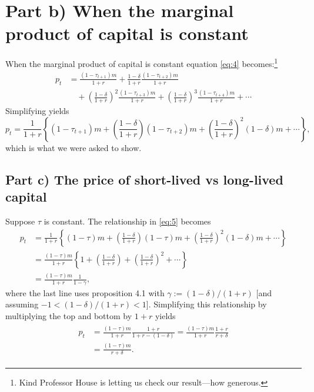 \documentclass[12pt]{pracjourn_rwr}
\theoremstyle{definition}
\theoremstyle{remark}
\begin{document}
\section{Part b) When the marginal product of capital is constant}

When the marginal product of capital is constant equation \eqref{eq:4} becomes:\footnote{Kind Professor House is letting us check our result---how generous.}
\begin{align*}
p_{t} &= \frac{(1-\tau_{t+1}) m}{1+r} + \frac{1-\delta}{1+r} \frac{(1-\tau_{t+2}) m}{1+r} \\
&\quad + \left( \frac{1-\delta}{1+r}  \right)^{2} \frac{(1-\tau_{t+3}) m}{1+r}
+ \left( \frac{1-\delta}{1+r}  \right)^{3} \frac{(1-\tau_{t+4}) m}{1+r} + \cdots
\end{align*}
Simplifying yields
\begin{equation}
\label{eq:5}
p_{t} = \frac{1}{1+r} \left\{
(1-\tau_{t+1})m + \left( \frac{1-\delta}{1+r} \right) (1-\tau_{t+2})m + \left( \frac{1-\delta}{1+r} \right)^{2}(1-\delta) m + \cdots
\right\},
\end{equation}
which is what we were asked to show.

\subsection{Part c) The price of short-lived vs long-lived capital}

Suppose $\tau$ is constant.
The relationship in \eqref{eq:5} becomes
\begin{align*}
p_{t} &= \frac{1}{1+r} \left\{
(1-\tau)m + \left( \frac{1-\delta}{1+r} \right) (1-\tau)m + \left( \frac{1-\delta}{1+r} \right)^{2}(1-\delta) m + \cdots
\right\} \\
&= \frac{(1-\tau)m}{1+r} \left\{
1 + \left( \frac{1-\delta}{1+r} \right) + \left( \frac{1-\delta}{1+r} \right)^{2} + \cdots
\right\} \\
&= \frac{(1-\tau)m}{1+r} \frac{1}{1 - \gamma},
\end{align*}
where the last line uses proposition 4.1 with $\gamma := (1-\delta)/(1+r)$
[and assuming $-1 < (1-\delta) / (1+r) < 1$].
Simplifying this relationship by multiplying the top and bottom by $1+r$ yields
\begin{align}
\label{eq:6}
\begin{split}
p_{t} &= \frac{(1-\tau)m}{1+r} \frac{1+r}{1+r - (1-\delta)} =
\frac{(1-\tau)m}{1+r} \frac{1+r}{r + \delta} \\
&= \frac{(1-\tau)m}{r+\delta}.
\end{split}
\end{align}
\end{document}
